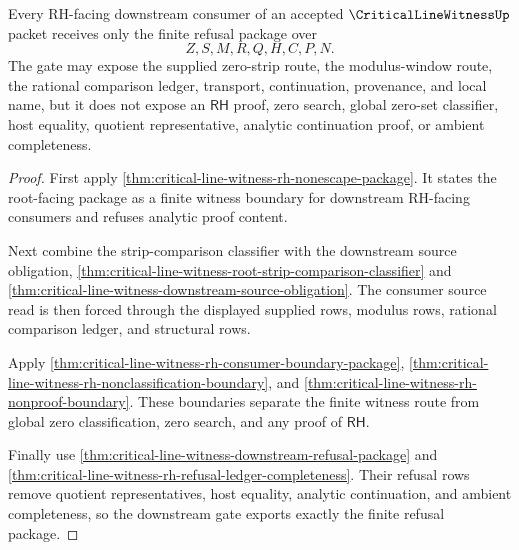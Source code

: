 \begin{theorem}
\label{thm:critical-line-witness-root-refusal-downstream-gate}
Every RH-facing downstream consumer of an accepted $\CriticalLineWitnessUp$
packet receives only the finite refusal package over
$$
Z,S,M,R,Q,H,C,P,N.
$$
The gate may expose the supplied zero-strip route, the modulus-window route,
the rational comparison ledger, transport, continuation, provenance, and local
name, but it does not expose an $\mathsf{RH}$ proof, zero search, global
zero-set classifier, host equality, quotient representative, analytic
continuation proof, or ambient completeness.
\end{theorem}
\begin{proof}
First apply \autoref{thm:critical-line-witness-rh-nonescape-package}. It
states the root-facing package as a finite witness boundary for downstream
RH-facing consumers and refuses analytic proof content.

Next combine the strip-comparison classifier with the downstream source
obligation,
\autoref{thm:critical-line-witness-root-strip-comparison-classifier} and
\autoref{thm:critical-line-witness-downstream-source-obligation}. The
consumer source read is then forced through the displayed supplied rows,
modulus rows, rational comparison ledger, and structural rows.

Apply \autoref{thm:critical-line-witness-rh-consumer-boundary-package},
\autoref{thm:critical-line-witness-rh-nonclassification-boundary}, and
\autoref{thm:critical-line-witness-rh-nonproof-boundary}. These boundaries
separate the finite witness route from global zero classification, zero
search, and any proof of $\mathsf{RH}$.

Finally use \autoref{thm:critical-line-witness-downstream-refusal-package} and
\autoref{thm:critical-line-witness-rh-refusal-ledger-completeness}. Their
refusal rows remove quotient representatives, host equality, analytic
continuation, and ambient completeness, so the downstream gate exports exactly
the finite refusal package.
\end{proof}

